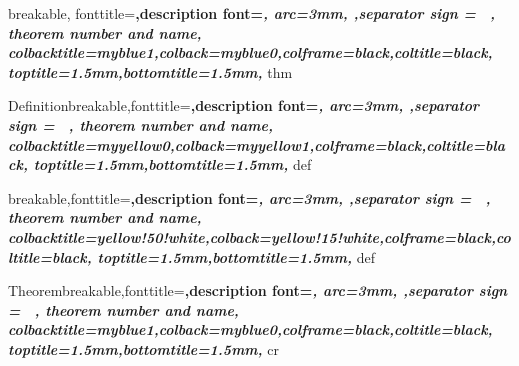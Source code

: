 \newcommand{\df}{\displaystyle \frac} 
\newcommand{\dlim}{\displaystyle \lim}
\newcommand{\dint}{\displaystyle \int}
\newcommand{\ra}{\rangle}
\newcommand{\la}{\langle}
\newcommand{\inner}[2]{{\langle #1,#2\rangle}}
\newcommand{\x}{\mathbf{x}}
\newcommand{\xt}{\mathbf{x}^{\mathsf{T}}}
\newcommand{\T}{{\mathsf{T}}}
\newcommand{\abf}{\mathbf{a}}
\newcommand{\abft}{\mathbf{a}^{\mathsf{T}}}
\newcommand{\R}{\mathbb{R}}
\newcommand{\C}{\mathbb{C}}
\newcommand{\E}{\mathrm{e}}
\newcommand{\F}{\mathbb{F}}
\newcommand{\X}{\mathbf{X}}
\newcommand{\Y}{\mathbf{Y}}
\newcommand{\f}{\mathbf{f}}
\newcommand{\U}{\mathbf{u}}
\newcommand{\D}{\mathrm{d}}
\newcommand{\MCG}{\mathcal{G}}
\newcommand{\MCF}{\mathcal{F}}
\newcommand{\M}{\mathcal{M}}
\newcommand{\MCB}{\mathcal{B}}
\newcommand{\MCT}{\mathcal{T}}
\newcommand{\LL}{\mathcal{L}}
\newcommand{\nullspace}{\mathrm{null}}
\newcommand{\range}{\mathrm{range}}
\newcommand{\Sum}[2]{{\sum_{#1}^{#2}}}
\newcommand{\Union}[2]{{\bigcup_{#1}^{#2}}}
\newcommand{\Intersection}[2]{{\bigcap_{#1}^{#2}}}

\newcommand{\pd}[1]{\frac{\partial}{\partial #1}}


{
	breakable,
	fonttitle=\bfseries\upshape,description font=\bfseries\itshape,
	arc=3mm, ,separator sign = \ ,
	theorem number and name,
	colbacktitle=myblue1,colback=myblue0,colframe=black,coltitle=black,
	toptitle=1.5mm,bottomtitle=1.5mm, 
}{thm}

%
  {Definition}{breakable,fonttitle=\bfseries\upshape,description font=\bfseries\itshape,
     arc=3mm, ,separator sign = \ ,
     theorem number and name,
     colbacktitle=myyellow0,colback=myyellow1,colframe=black,coltitle=black,
     toptitle=1.5mm,bottomtitle=1.5mm,
     }{def}
     
%
  {}{breakable,fonttitle=\bfseries\upshape,description font=\bfseries\itshape,
     arc=3mm, ,separator sign = \ ,
     theorem number and name,
     colbacktitle=yellow!50!white,colback=yellow!15!white,colframe=black,coltitle=black,
     toptitle=1.5mm,bottomtitle=1.5mm,
     }{def}

%
  {Theorem}{breakable,fonttitle=\bfseries\upshape,description font=\bfseries\itshape,
     arc=3mm, ,separator sign = \ ,
     theorem number and name,
     colbacktitle=myblue1,colback=myblue0,colframe=black,coltitle=black,
     toptitle=1.5mm,bottomtitle=1.5mm,
     }{cr}
     
